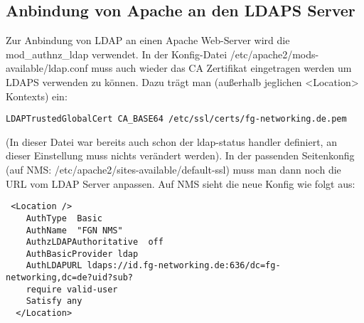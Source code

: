 \documentclass[11pt,a4paper,titlepage=firstiscover]{scrartcl} %
\begin{document}
\subsection{Anbindung von Apache an den LDAPS Server}
Zur Anbindung von LDAP an einen Apache Web-Server wird die mod_authnz_ldap verwendet. In der Konfig-Datei /etc/apache2/mods-available/ldap.conf muss auch wieder das CA Zertifikat eingetragen werden um LDAPS verwenden zu können. Dazu trägt man (außerhalb jeglichen <Location> Kontexts) ein:
\begin{lstlisting}
LDAPTrustedGlobalCert CA_BASE64 /etc/ssl/certs/fg-networking.de.pem
\end{lstlisting}
(In dieser Datei war bereits auch schon der ldap-status handler definiert, an dieser Einstellung muss nichts verändert werden). In der passenden Seitenkonfig (auf NMS: /etc/apache2/sites-available/default-ssl) muss man dann noch die URL vom LDAP Server anpassen. Auf NMS sieht die neue Konfig wie folgt aus:
\begin{lstlisting}
 <Location />
    AuthType  Basic
    AuthName  "FGN NMS"
    AuthzLDAPAuthoritative  off
    AuthBasicProvider ldap
    AuthLDAPURL ldaps://id.fg-networking.de:636/dc=fg-networking,dc=de?uid?sub?
    require valid-user
    Satisfy any
  </Location>
\end{lstlisting}
\end{document}

